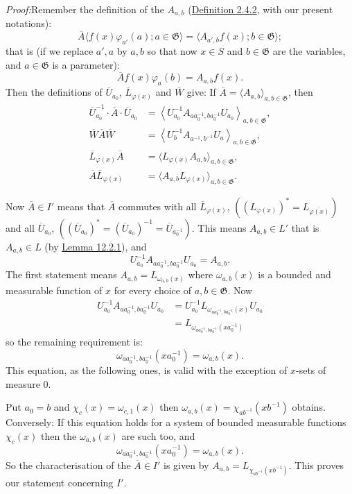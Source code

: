 \documentclass[12pt,b5paper,twoside]{article}
\newcommand{\Proof}{\par\noindent\textit{Proof:}\enspace}
\newcommand{\defref}[1]{\hyperref[def:#1]{Definition #1}}
\newcommand{\lemref}[1]{\hyperref[lem:#1]{Lemma #1}}
\begin{document}
\Proof Remember the definition of the $A_{a,b}$ (\defref{2.4.2}, with our
present notations):
\[
 \overline A\langle f(x)\varphi_{a'}(a);a\in\mathfrak G\rangle
 =\langle A_{a',b}f(x);b\in\mathfrak G\rangle;
\]
that is (if we replace $a',a$ by $a,b$ so that now $x\in S$ and
$b\in\mathfrak G$ are the variables, and $a\in\mathfrak G$ is a parameter):
\[
 \overline Af(x)\varphi_a(b)=A_{a,b}f(x).
\]
Then the definitions of $\overline U_{a_0}$,
$\overline L_{\varphi(x)}$ and $\overline W$ give: If
$\overline A=\langle A_{a,b}\rangle_{a,b\in\mathfrak G}$, then
\begin{align*}
 \overline U_{a_0}^{-1}\mathbin{\cdot}\overline A
 \mathbin{\cdot}\overline U_{a_0}
 &=\left\langle
 U_{a_0}^{-1}A_{aa_0^{-1},ba_0^{-1}}U_{a_0}
 \right\rangle_{a,b\in\mathfrak G},\\
 \overline W\overline A\overline W
 &=\left\langle U_b^{-1}A_{a^{-1},b^{-1}}U_a
 \right\rangle_{a,b\in\mathfrak G},\\
 \overline L_{\varphi(x)}\overline A
 &=\langle L_{\varphi(x)}A_{a,b}\rangle_{a,b\in\mathfrak G},\\
 \overline A\overline L_{\varphi(x)}
 &=\langle A_{a,b}L_{\varphi(x)}\rangle_{a,b\in\mathfrak G}.
\end{align*}

Now $\overline A\in I'$ means that $\overline A$ commutes with all
$\overline L_{\varphi(x)}$,
$((L_{\varphi(x)})^*=L_{\overline{\varphi(x)}})$ and all
$\overline U_{a_0}$,
$((\overline U_{a_0})^*=(\overline U_{a_0})^{-1}
=\overline U_{a_0^{-1}})$. This means $A_{a,b}\in L'$ that is
$A_{a,b}\in L$ (by \lemref{12.2.1}), and
\[
 U_{a_0}^{-1}A_{aa_0^{-1},ba_0^{-1}}U_{a_0}=A_{a,b}.
\]
The first statement means $A_{a,b}=L_{\omega_{a,b}(x)}$ where
$\omega_{a,b}(x)$ is a bounded and measurable function of $x$ for every
choice of $a,b\in\mathfrak G$. Now
\begin{align*}
 U_{a_0}^{-1}A_{aa_0^{-1},ba_0^{-1}}U_{a_0}
 &=U_{a_0}^{-1}L_{\omega_{aa_0^{-1},ba_0^{-1}}(x)}U_{a_0}\\
 &=L_{\omega_{aa_0^{-1},ba_0^{-1}}(xa_0^{-1})}
\end{align*}
so the remaining requirement is:
\[
 \omega_{aa_0^{-1},ba_0^{-1}}(xa_0^{-1})=\omega_{a,b}(x).
\]
This equation, as the following ones, is valid with the exception of $x$-sets
of measure $0$.

Put $a_0=b$ and $\chi_c(x)=\omega_{c,1}(x)$ then
$\omega_{a,b}(x)=\chi_{ab^{-1}}(xb^{-1})$ obtains. Conversely: If this
equation holds for a system of bounded measurable functions $\chi_c(x)$ then
the $\omega_{a,b}(x)$ are such too, and
\[
 \omega_{aa_0^{-1},ba_0^{-1}}(xa_0^{-1})=\omega_{a,b}(x).
\]
So the characterisation of the $\overline A\in I'$ is given by
$A_{a,b}=L_{\chi_{ab^{-1}}(xb^{-1})}$. This proves our statement concerning
$I'$.
\end{document}
